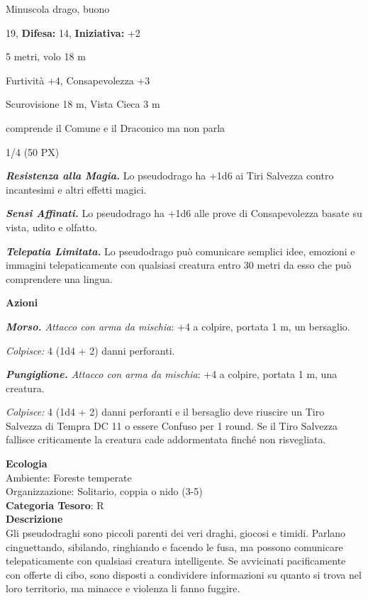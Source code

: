 \begin{multicols}{2}
{
\noindent
\begin{description}[noitemsep, topsep=0pt, parsep=0pt, partopsep=0pt, leftmargin=0cm, labelwidth=2.2cm]
	\item[\textbf{Taglia/Tipo:}] Minuscola drago, buono
	\item[\textbf{Caratt.:}] 
	\item[\textbf{Punti Ferita:}] 19,  \textbf{Difesa:} 14,  \textbf{Iniziativa:} +2
	\item[\textbf{Movimento:}] 5 metri, volo 18 m
	\item[\textbf{Tiri Salvez.:}] 
	\item[\textbf{Comp.:}] Furtività +4, Consapevolezza +3
	\item[\textbf{Sensi:}] Scurovisione 18 m, Vista Cieca 3 m
	\item[\textbf{Linguaggi:}] comprende il Comune e il Draconico ma non parla
	\item[\textbf{Sfida:}] 1/4 (50 PX)\smallskip
\end{description}

\emph{\textbf{Resistenza alla Magia.}} Lo pseudodrago ha +1d6 ai Tiri Salvezza contro incantesimi e altri effetti magici.

\emph{\textbf{Sensi Affinati.}} Lo pseudodrago ha +1d6 alle prove di Consapevolezza basate su vista, udito e olfatto.

\emph{\textbf{Telepatia Limitata.}} Lo pseudodrago può comunicare semplici idee, emozioni e immagini telepaticamente con qualsiasi creatura entro 30 metri da esso che può comprendere una lingua.

\textbf{Azioni}

\emph{\textbf{Morso.} Attacco con arma da mischia}: +4 a colpire, portata 1 m, un bersaglio.

\emph{Colpisce:} 4 (1d4 + 2) danni perforanti.

\emph{\textbf{Pungiglione.} Attacco con arma da mischia}: +4 a colpire, portata 1 m, una creatura.

\emph{Colpisce:} 4 (1d4 + 2) danni perforanti e il bersaglio deve riuscire un Tiro Salvezza di Tempra DC 11 o essere Confuso per 1 round. Se il Tiro Salvezza fallisce criticamente la creatura cade addormentata finché non risvegliata.

\textbf{Ecologia}\\
Ambiente: Foreste temperate\\
Organizzazione: Solitario, coppia o nido (3-5)\\
\textbf{Categoria Tesoro}: R\\
\textbf{Descrizione}\\
Gli pseudodraghi sono piccoli parenti dei veri draghi, giocosi e timidi. Parlano cinguettando, sibilando, ringhiando e facendo le fusa, ma possono comunicare telepaticamente con qualsiasi creatura intelligente. Se avvicinati pacificamente con offerte di cibo, sono disposti a condividere informazioni su quanto si trova nel loro territorio, ma minacce e violenza li fanno fuggire.

}
\end{multicols}
